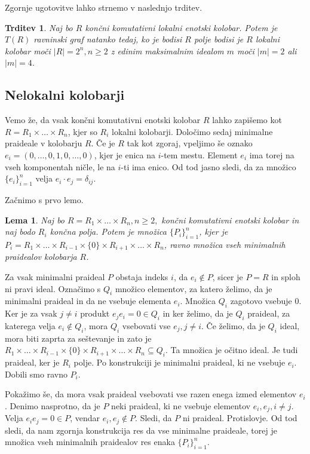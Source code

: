 \documentclass[a4paper, 12pt]{amsart}
\theoremstyle{definition} %
\theoremstyle{plain} %
\newtheorem{lema}[definicija]{Lema}
\newtheorem{trditev}[definicija]{Trditev}
\begin{document}
Zgornje ugotovitve lahko strnemo v naslednjo trditev.

\begin{trditev}
Naj bo $R$ končni komutativni lokalni enotski kolobar. Potem je $T(R)$ ravninski graf natanko tedaj, ko je bodisi $R$ polje bodisi je $R$ lokalni kolobar moči $|R| = 2^n, n\ge 2$ z edinim maksimalnim idealom $m$ moči $|m| = 2$ ali $|m| = 4$.
\end{trditev}

\subsection{Nelokalni kolobarji}

Vemo že, da vsak končni komutativni enotski kolobar $R$ lahko zapišemo kot $R= R_1 \times \dots \times R_n$, kjer so $R_i$ lokalni kolobarji. Določimo sedaj minimalne praideale v kolobarju $R$. Če je $R$ tak kot zgoraj, vpeljimo še oznako $e_i = (0,\dots,0,1,0,\dots,0)$, kjer je enica na $i$-tem mestu. Element $e_i$ ima torej na vseh komponentah ničle, le na $i$-ti ima enico. Od tod jasno sledi, da za množico $\{e_i\}_{i=1}^n$ velja $e_i \cdot e_j = \delta_{ij}$.

Začnimo s prvo lemo. 
\begin{lema}
\label{minPra1}
Naj bo $R=R_1 \times \dots \times R_n, n\ge 2,$ končni komutativni enotski kolobar in naj bodo $R_i$ končna polja. Potem je množica $\{P_i\}_{i=1}^n$, kjer je $P_i = R_1 \times \dots \times R_{i-1} \times \{0\} \times R_{i+1} \times \dots \times R_n$, ravno množica vseh minimalnih praidealov kolobarja $R$.
\end{lema}

\proof
Za vsak minimalni praideal $P$ obstaja indeks $i$, da $e_i\notin P$, sicer je $P = R$ in sploh ni pravi ideal. Označimo s $Q_i$ množico elementov, za katero želimo, da je minimalni praideal in da ne vsebuje elementa $e_i$. Množica $Q_i$ zagotovo vsebuje $0$. Ker je za vsak $j\neq i$ produkt $e_j e_i = 0\in Q_i$ in ker želimo, da je $Q_i$ praideal, za katerega velja $e_i \notin Q_i$, mora $Q_i$ vsebovati vse $e_j, j\neq i$. Če želimo, da je $Q_i$ ideal, mora biti zaprta za seštevanje in zato je $ R_1 \times \dots \times R_{i-1} \times \{0\} \times R_{i+1} \times \dots \times R_n \subseteq Q_i$. Ta množica je očitno ideal. Je tudi praideal, ker je $R_i$ polje. Po konstrukciji je minimalni praideal, ki ne vsebuje $e_i$. Dobili smo ravno $P_i$.

Pokažimo še, da mora vsak praideal vsebovati vse razen enega izmed elementov $e_i$. Denimo nasprotno, da je $P$ neki praideal, ki ne vsebuje elementov $e_i,e_j, i\neq j$. Velja $e_i e_j = 0\in P$, vendar $e_i,e_j \notin P$. Sledi, da $P$ ni praideal. Protislovje. 
Od tod sledi, da nam zgornja konstrukcija res da vse minimalne praideale, torej je množica vseh minimalnih praidealov res enaka $\{P_i\}_{i=1}^n$.
\endproof
\end{document}
